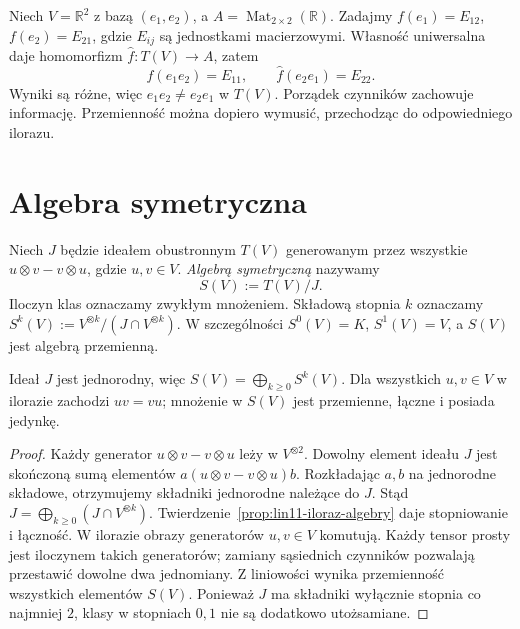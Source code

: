 \begin{przyklad}
\label{prz:lin11-nieprzemienna}
Niech \(V=\mathbb R^2\) z bazą
\((e_1,e_2)\), a \(A=\operatorname{Mat}_{2\times2}(\mathbb R)\).
Zadajmy \(f(e_1)=E_{12}\),
\(f(e_2)=E_{21}\), gdzie \(E_{ij}\)
są jednostkami macierzowymi.
Własność uniwersalna daje homomorfizm
\(\widehat f\colon T(V)\to A\), zatem
\[
 \widehat f(e_1e_2)=E_{11},\qquad
 \widehat f(e_2e_1)=E_{22}.
\]
Wyniki są różne, więc
\(e_1e_2\ne e_2e_1\) w \(T(V)\).
Porządek czynników zachowuje informację.
Przemienność można dopiero wymusić,
przechodząc do odpowiedniego ilorazu.
\end{przyklad}

\section{Algebra symetryczna}
\label{sec:lin11-symetryczna}

\begin{definicja}
\label{def:lin11-symetryczna}
Niech \(J\) będzie ideałem obustronnym
\(T(V)\) generowanym przez wszystkie
\(u\otimes v-v\otimes u\), gdzie \(u,v\in V\).
\emph{Algebrą symetryczną} nazywamy
\[
 S(V):=T(V)/J.
\]
Iloczyn klas oznaczamy zwykłym mnożeniem.
Składową stopnia \(k\) oznaczamy
\(S^k(V):=V^{\otimes k}/(J\cap V^{\otimes k})\).
W szczególności \(S^0(V)=K\),
\(S^1(V)=V\), a \(S(V)\) jest
algebrą przemienną.
\end{definicja}

\begin{stwierdzenie}
\label{prop:lin11-sym-stopnie}
Ideał \(J\) jest jednorodny, więc
\(S(V)=\bigoplus_{k\geq0}S^k(V)\).
Dla wszystkich \(u,v\in V\) w ilorazie
zachodzi \(uv=vu\); mnożenie w \(S(V)\)
jest przemienne, łączne i posiada jedynkę.
\end{stwierdzenie}
\begin{proof}
Każdy generator \(u\otimes v-v\otimes u\)
leży w \(V^{\otimes2}\).
Dowolny element ideału \(J\)
jest skończoną sumą elementów
\(a(u\otimes v-v\otimes u)b\).
Rozkładając \(a,b\) na jednorodne
składowe, otrzymujemy składniki
jednorodne należące do \(J\).
Stąd \(J=\bigoplus_{k\ge0}(J\cap V^{\otimes k})\).
Twierdzenie~\ref{prop:lin11-iloraz-algebry}
daje stopniowanie i łączność.
W ilorazie obrazy generatorów
\(u,v\in V\) komutują.
Każdy tensor prosty jest iloczynem
takich generatorów; zamiany sąsiednich
czynników pozwalają przestawić
dowolne dwa jednomiany. Z liniowości
wynika przemienność wszystkich
elementów \(S(V)\).
Ponieważ \(J\) ma składniki
wyłącznie stopnia co najmniej \(2\),
klasy w stopniach \(0,1\) nie są
dodatkowo utożsamiane.
\end{proof}

